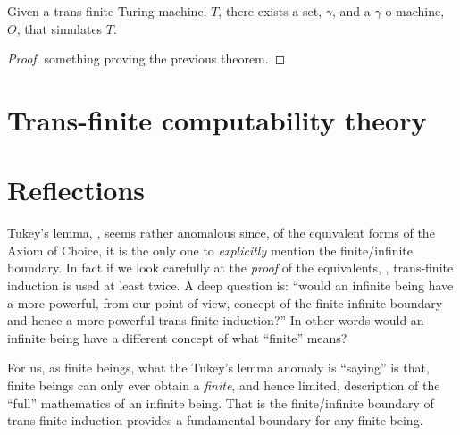 \documentclass[a4paper,openany]{amsbook}
\begin{document}
\begin{theorem}

Given a trans-finite Turing machine, $T$, there exists a set, $\gamma$, and a
$\gamma$-o-machine, $O$, that simulates $T$.

\end{theorem}

\begin{proof}
something proving the previous theorem.
\end{proof}

\chapter{Trans-finite computability theory}

\chapter{Reflections}

Tukey's lemma, \cite[Maximal Principle II, page 10]{jech1973axiomOfChoice}, seems rather
anomalous since, of the equivalent forms of the Axiom of Choice, it is the only one to
\emph{explicitly} mention the finite/infinite boundary. In fact if we look carefully at
the \emph{proof} of the equivalents, \cite[Theorem 2.1, page 10]{jech1973axiomOfChoice},
trans-finite induction is used at least twice.  A deep question is: ``would an infinite
being have a more powerful, from our point of view, concept of the finite-infinite
boundary and hence a more powerful trans-finite induction?'' In other words would an 
infinite being have a different concept of what ``finite'' means?

For us, as finite beings, what the Tukey's lemma anomaly is ``saying'' is that, finite
beings can only ever obtain a \emph{finite}, and hence limited, description of the
``full'' mathematics of an infinite being. That is the finite/infinite boundary of 
trans-finite induction provides a fundamental boundary for any finite being.

\printbibliography
\end{document}
